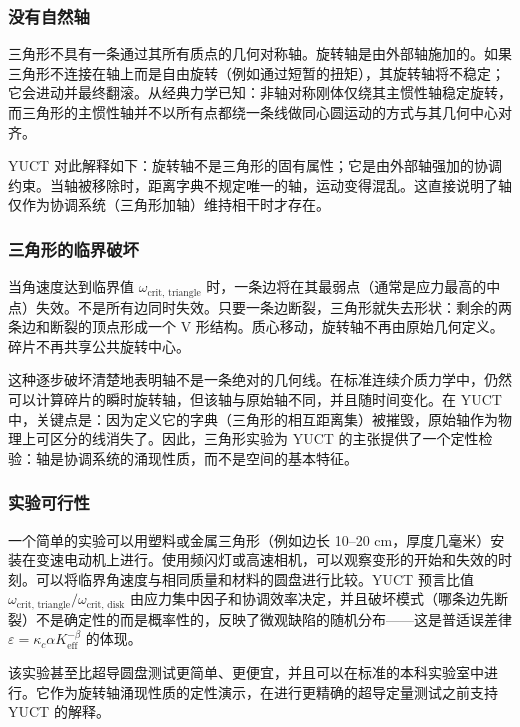 \documentclass[12pt,a4paper]{article}
\begin{document}
	\subsubsection{没有自然轴}
	
	三角形不具有一条通过其所有质点的几何对称轴。旋转轴是由外部轴施加的。如果三角形不连接在轴上而是自由旋转（例如通过短暂的扭矩），其旋转轴将不稳定；它会进动并最终翻滚。从经典力学已知：非轴对称刚体仅绕其主惯性轴稳定旋转，而三角形的主惯性轴并不以所有点都绕一条线做同心圆运动的方式与其几何中心对齐。
	
	YUCT 对此解释如下：旋转轴不是三角形的固有属性；它是由外部轴强加的协调约束。当轴被移除时，距离字典不规定唯一的轴，运动变得混乱。这直接说明了轴仅作为协调系统（三角形加轴）维持相干时才存在。
	
	\subsubsection{三角形的临界破坏}
	
	当角速度达到临界值 \(\omega_{\text{crit, triangle}}\) 时，一条边将在其最弱点（通常是应力最高的中点）失效。不是所有边同时失效。只要一条边断裂，三角形就失去形状：剩余的两条边和断裂的顶点形成一个 V 形结构。质心移动，旋转轴不再由原始几何定义。碎片不再共享公共旋转中心。
	
	这种逐步破坏清楚地表明轴不是一条绝对的几何线。在标准连续介质力学中，仍然可以计算碎片的瞬时旋转轴，但该轴与原始轴不同，并且随时间变化。在 YUCT 中，关键点是：因为定义它的字典（三角形的相互距离集）被摧毁，原始轴作为物理上可区分的线消失了。因此，三角形实验为 YUCT 的主张提供了一个定性检验：轴是协调系统的涌现性质，而不是空间的基本特征。
	
	\subsubsection{实验可行性}
	
	一个简单的实验可以用塑料或金属三角形（例如边长 10–20 cm，厚度几毫米）安装在变速电动机上进行。使用频闪灯或高速相机，可以观察变形的开始和失效的时刻。可以将临界角速度与相同质量和材料的圆盘进行比较。YUCT 预言比值 \(\omega_{\text{crit, triangle}} / \omega_{\text{crit, disk}}\) 由应力集中因子和协调效率决定，并且破坏模式（哪条边先断裂）不是确定性的而是概率性的，反映了微观缺陷的随机分布——这是普适误差律 \(\varepsilon = \kappa_c \alpha K_{\mathrm{eff}}^{-\beta}\) 的体现。
	
	该实验甚至比超导圆盘测试更简单、更便宜，并且可以在标准的本科实验室中进行。它作为旋转轴涌现性质的定性演示，在进行更精确的超导定量测试之前支持 YUCT 的解释。
	
\end{document}
